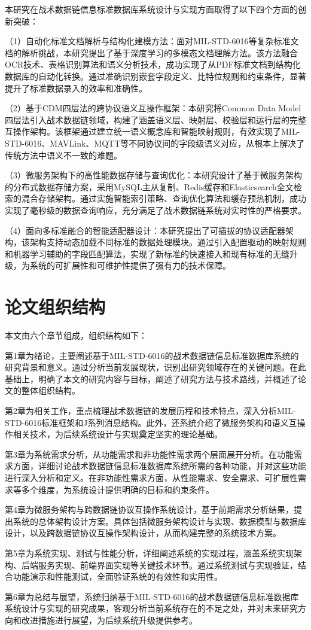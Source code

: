 本研究在战术数据链信息标准数据库系统设计与实现方面取得了以下四个方面的创新突破：

（1）自动化标准文档解析与结构化建模方法：面对MIL-STD-6016等复杂标准文档的解析挑战，本研究提出了基于深度学习的多模态文档理解方法。该方法融合OCR技术、表格识别算法和语义分析技术，成功实现了从PDF标准文档到结构化数据库的自动化转换。通过准确识别嵌套字段定义、比特位规则和约束条件，显著提升了标准数据录入的效率和准确性。

（2）基于CDM四层法的跨协议语义互操作框架：本研究将Common Data Model四层法引入战术数据链领域，构建了涵盖语义层、映射层、校验层和运行层的完整互操作架构。该框架通过建立统一语义概念库和智能映射规则，有效实现了MIL-STD-6016、MAVLink、MQTT等不同协议间的字段级语义对应，从根本上解决了传统方法中语义不一致的难题。

（3）微服务架构下的高性能数据存储与查询优化：本研究设计了基于微服务架构的分布式数据存储方案，采用MySQL主从复制、Redis缓存和Elasticsearch全文检索的混合存储架构。通过实施智能索引策略、查询优化算法和缓存预热机制，成功实现了毫秒级的数据查询响应，充分满足了战术数据链系统对实时性的严格要求。

（4）面向多标准融合的智能适配器设计：本研究提出了可插拔的协议适配器架构，该架构支持动态加载不同标准的数据处理模块。通过引入配置驱动的映射规则和机器学习辅助的字段匹配算法，实现了新标准的快速接入和现有标准的无缝升级，为系统的可扩展性和可维护性提供了强有力的技术保障。

\section{论文组织结构}

本文由六个章节组成，组织结构如下：

第1章为绪论，主要阐述基于MIL-STD-6016的战术数据链信息标准数据库系统的研究背景和意义。通过分析当前发展现状，识别出研究领域存在的关键问题。在此基础上，明确了本文的研究内容与目标，阐述了研究方法与技术路线，并概述了论文的整体组织结构。

第2章为相关工作，重点梳理战术数据链的发展历程和技术特点，深入分析MIL-STD-6016标准框架和J系列消息结构。此外，还系统介绍了微服务架构和语义互操作相关技术，为后续系统设计与实现奠定坚实的理论基础。

第3章为系统需求分析，从功能需求和非功能性需求两个层面展开分析。在功能需求方面，详细讨论战术数据链信息标准数据库系统所需的各种功能，并对这些功能进行深入分析和定义。在非功能性需求方面，从性能需求、安全需求、可扩展性需求等多个维度，为系统设计提供明确的目标和约束条件。

第4章为微服务架构与跨数据链协议互操作系统设计，基于前期需求分析结果，提出系统的总体架构设计方案。具体包括微服务架构设计与实现、数据模型与数据库设计，以及跨数据链协议互操作架构设计，从而构建完整的系统技术方案。

第5章为系统实现、测试与性能分析，详细阐述系统的实现过程，涵盖系统实现架构、后端服务实现、前端界面实现等关键技术环节。通过系统测试与实现验证，结合功能演示和性能测试，全面验证系统的有效性和实用性。

第6章为总结与展望，系统归纳基于MIL-STD-6016的战术数据链信息标准数据库系统设计与实现的研究成果，客观分析当前系统存在的不足之处，并对未来研究方向和改进措施进行展望，为后续系统升级提供参考。
